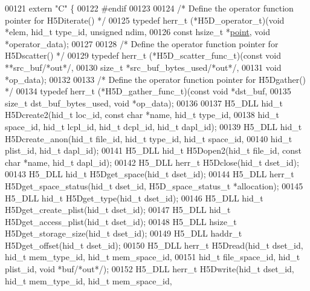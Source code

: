 \begin{DoxyCode}
00121 \textcolor{keyword}{extern} \textcolor{stringliteral}{"C"} \{
00122 \textcolor{preprocessor}{#endif}
00123 
00124 \textcolor{comment}{/* Define the operator function pointer for H5Diterate() */}
00125 \textcolor{keyword}{typedef} herr\_t (*H5D\_operator\_t)(\textcolor{keywordtype}{void} *elem, hid\_t type\_id, \textcolor{keywordtype}{unsigned} ndim,
00126                  \textcolor{keyword}{const} hsize\_t *\hyperlink{structpoint}{point}, \textcolor{keywordtype}{void} *operator\_data);
00127 
00128 \textcolor{comment}{/* Define the operator function pointer for H5Dscatter() */}
00129 \textcolor{keyword}{typedef} herr\_t (*H5D\_scatter\_func\_t)(\textcolor{keyword}{const} \textcolor{keywordtype}{void} **src\_buf\textcolor{comment}{/*out*/},
00130                                      \textcolor{keywordtype}{size\_t} *src\_buf\_bytes\_used\textcolor{comment}{/*out*/},
00131                                      \textcolor{keywordtype}{void} *op\_data);
00132 
00133 \textcolor{comment}{/* Define the operator function pointer for H5Dgather() */}
00134 \textcolor{keyword}{typedef} herr\_t (*H5D\_gather\_func\_t)(\textcolor{keyword}{const} \textcolor{keywordtype}{void} *dst\_buf,
00135                                     \textcolor{keywordtype}{size\_t} dst\_buf\_bytes\_used, \textcolor{keywordtype}{void} *op\_data);
00136 
00137 H5\_DLL hid\_t H5Dcreate2(hid\_t loc\_id, \textcolor{keyword}{const} \textcolor{keywordtype}{char} *name, hid\_t type\_id,
00138     hid\_t space\_id, hid\_t lcpl\_id, hid\_t dcpl\_id, hid\_t dapl\_id);
00139 H5\_DLL hid\_t H5Dcreate\_anon(hid\_t file\_id, hid\_t type\_id, hid\_t space\_id,
00140     hid\_t plist\_id, hid\_t dapl\_id);
00141 H5\_DLL hid\_t H5Dopen2(hid\_t file\_id, \textcolor{keyword}{const} \textcolor{keywordtype}{char} *name, hid\_t dapl\_id);
00142 H5\_DLL herr\_t H5Dclose(hid\_t dset\_id);
00143 H5\_DLL hid\_t H5Dget\_space(hid\_t dset\_id);
00144 H5\_DLL herr\_t H5Dget\_space\_status(hid\_t dset\_id, H5D\_space\_status\_t *allocation);
00145 H5\_DLL hid\_t H5Dget\_type(hid\_t dset\_id);
00146 H5\_DLL hid\_t H5Dget\_create\_plist(hid\_t dset\_id);
00147 H5\_DLL hid\_t H5Dget\_access\_plist(hid\_t dset\_id);
00148 H5\_DLL hsize\_t H5Dget\_storage\_size(hid\_t dset\_id);
00149 H5\_DLL haddr\_t H5Dget\_offset(hid\_t dset\_id);
00150 H5\_DLL herr\_t H5Dread(hid\_t dset\_id, hid\_t mem\_type\_id, hid\_t mem\_space\_id,
00151             hid\_t file\_space\_id, hid\_t plist\_id, \textcolor{keywordtype}{void} *buf\textcolor{comment}{/*out*/});
00152 H5\_DLL herr\_t H5Dwrite(hid\_t dset\_id, hid\_t mem\_type\_id, hid\_t mem\_space\_id,

\end{DoxyCode}
